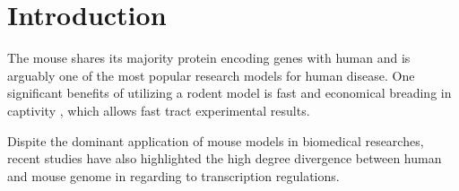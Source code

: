 \section{Introduction}

The mouse shares its majority protein encoding genes with human and is arguably one of the most popular research models for human disease. One significant benefits of utilizing a rodent model is fast and economical breading in captivity \cite{Rosenthal_2007}, which allows fast tract experimental results. \cite{Vandamme_2014} 

Dispite the dominant application of mouse models in biomedical researches, recent studies have also highlighted the high degree divergence between human and mouse genome in regarding to transcription regulations. \cite{25409824} 


\cite{Justice_2011}